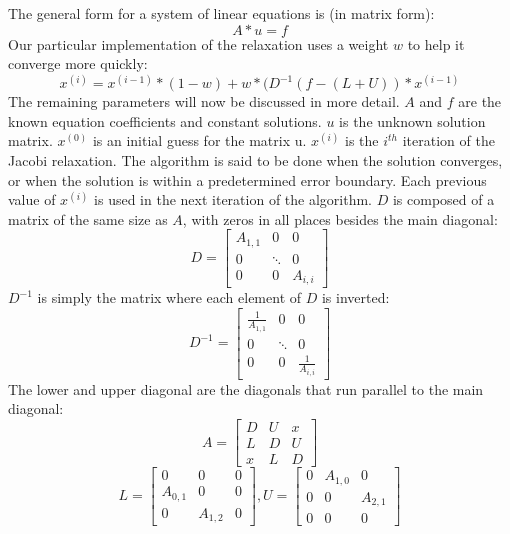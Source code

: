\documentclass[10pt]{article}
\begin{document}
\begin{multicols}{2}
    The general form for a system of linear equations is (in matrix form):
    \[A*u=f\]
    Our particular implementation of the relaxation uses a weight \(w\) to help it converge more quickly:
    \[x^{(i)} = x^{(i-1)} * (1-w)+w*(D^{-1}(f-(L+U))*x^{(i-1)}\]
    The remaining parameters will now be discussed in more detail.
    \(A\) and \(f\) are the known equation coefficients and constant solutions.
    \(u\) is the unknown solution matrix.
    \(x^{(0)}\) is an initial guess for the matrix u.
    \(x^{(i)}\) is the \(i^{th}\) iteration of the Jacobi relaxation.
    The algorithm is said to be done when the solution converges, or when the solution is within a predetermined error boundary.
    Each previous value of \(x^{(i)}\) is used in the next iteration of the algorithm.
    \(D\) is composed of a matrix of the same size as \(A\), with zeros in all places besides the main diagonal:
    \[
        D =
        \begin{bmatrix*}
        A_{1,1}     & 0         & 0 \\
        0           & \ddots    & 0 \\
        0           & 0         & A_{i,i}
        \end{bmatrix*}
    \]
    \(D^{-1}\) is simply the matrix where each element of \(D\) is inverted:
    \[
        D^{-1} =
        \begin{bmatrix*}
        \frac{1}{A_{1,1}}   & 0         & 0 \\
        0                   & \ddots    & 0 \\
        0                   & 0         & \frac{1}{A_{i,i}}
        \end{bmatrix*}
    \]
    The lower and upper diagonal are the diagonals that run parallel to the main diagonal:
    \[
        A=
        \begin{bmatrix*}
        D & U & x \\
        L & D & U \\
        x & L & D
        \end{bmatrix*}
    \]
    \[
        L=
        \begin{bmatrix*}
        0 & 0               & 0 \\
        A_{0,1} & 0         & 0 \\
        0       & A_{1,2}   & 0
        \end{bmatrix*}
        ,
        U=
        \begin{bmatrix*}
        0 & A_{1,0} & 0       \\
        0 & 0       & A_{2,1} \\
        0 & 0       & 0
        \end{bmatrix*}
    \]
    

\end{multicols}
\end{document}
